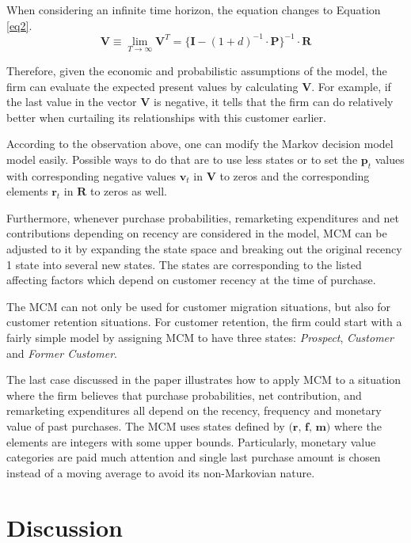 \documentclass[11pt]{article}
\begin{document}
When considering an infinite time horizon, the equation changes to Equation \ref{eq2}.
\begin{equation}\label{eq2}
\textbf{V} \equiv \lim_{T \rightarrow \infty} \textbf{V}^T = \{\textbf{I} - (1 + d)^{-1} \cdot \textbf{P} \}^{-1} \cdot \textbf{R}
\end{equation}


Therefore, given the economic and probabilistic assumptions of the model, the firm can evaluate the expected present values by calculating $\textbf{V}$. For example, if the last value in the vector $\textbf{V}$ is negative, it tells that the firm can do relatively better when curtailing its relationships with this customer earlier.

According to the observation above, one can modify the Markov decision model model easily. Possible ways to do that are to use less states or to set the $\textbf{p}_t$ values with corresponding negative values $\textbf{v}_t$ in $\textbf{V}$ to zeros and the corresponding elements $\textbf{r}_t$ in $\textbf{R}$ to zeros as well.%

Furthermore, whenever purchase probabilities, remarketing expenditures and net contributions depending on recency are considered in the model, MCM can be adjusted to it by expanding the state space and breaking out the original recency 1 state into several new states. The states are  corresponding to the listed affecting factors which depend on customer recency at the time of purchase. 

The MCM can not only be used for customer migration situations, but also for customer retention situations. For customer retention, the firm could start with a fairly simple model by assigning MCM to have three states:  \textit{Prospect}, \textit{Customer} and \textit{Former Customer}. 

The last case discussed in the paper illustrates how to apply MCM to a situation where the firm believes that purchase probabilities, net contribution, and remarketing expenditures all depend on the recency, frequency and monetary value of past purchases. The MCM uses states defined by $\textbf{(r, f, m)}$ where the elements are integers with some upper bounds. Particularly, monetary value categories are paid much attention and single last purchase amount is chosen instead of a moving average to avoid its non-Markovian nature.




\section{Discussion}
\end{document}
